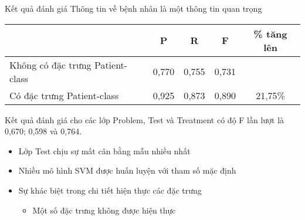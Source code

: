 \begin{frame}{Kết quả đánh giá}
\putlogo
Thông tin về bệnh nhân là một thông tin quan trọng
\begin{center}
	\renewcommand{\tabcolsep}{3pt}
	\footnotesize\sffamily
	
	\begin{tabular}{@{}lcccc@{}}
	\toprule
	& \textbf{P} & \textbf{R} & \textbf{F} & \% tăng lên\\
	\midrule
	Không có đặc trưng Patient-class & 0,770 & 0,755 & 0,731 &\\
	Có đặc trưng Patient-class & 0,925 & 0,873 & 0,890 & 21,75\%\\
	\bottomrule
	\end{tabular}
\end{center}

Kết quả đánh giá cho các lớp Problem, Test và Treatment có độ F lần lượt là 0,670; 0,598 và 0,764.
\begin{itemize}
	\item Lớp Test chịu sự mất cân bằng mẫu nhiều nhất
	\item Nhiều mô hình SVM được huấn luyện với tham số mặc định
	\item Sự khác biệt trong chi tiết hiện thực các đặc trưng
	\begin{itemize}
		\item Một số đặc trưng không được hiện thực
	\end{itemize}
\end{itemize}
\end{frame}
